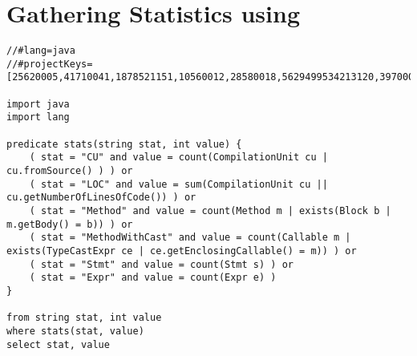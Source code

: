 
\chapter{Gathering Statistics using \ql{}}
\label{cha:ap:qlstats}

\begin{lstlisting}[style=ql]
//#lang=java
//#projectKeys=[25620005,41710041,1878521151,10560012,28580018,5629499534213120,39700035,1977701350,1873830050,1862920424,1864641207,1877441651,48190073,1506524326358,1505958786078,1506178136997,1981031959,1879370025,1874822090,1790840019,1864280925,41633751,1876381512,12760012,41900048,1354020033,1505967666111,1867300198,1795210073,1505968065973,1862771155,940125,2033800529,11020029,1505958645990,7870148,1861351166,1977291520,1978970761,1983122555,2161760237,1859762138,2035290917,1883290288,6890001,1981271240,1864352334,1979491471,1860005,13140029,24100035,35820136,1875601332,48640041,1877370912,1869242377,1872920090,1859802304,1973732641,1867040683,7880116,1971931877,33010046,18080071,1920002,1882261774,1855931308,1882380719,48790008,1505950676906,4870147,1860497242,1860885457,1883110029,1863051015,49820009,122244312,1861232120,1869270619,4850066,1872820788,6780442,1506173707109,1506179906986,32470022,1874830030,1797540044,1971780069,1968931653,1856951538,1908860284,1861491397,1884210730,1867130795,15070006,1798270110,46050017,1983122556,1856772013,35820134,1866091663,7860138,1866211423,1506494716249,1860946741,1505959776000,1880610249,1854901091,28741840,1972891707,6810158,1866061568,1982361113,1883200014,1505956416964,33815278,1869251537,1863190961,1874861017,1880570060,1863170850,1876500483,1873950073,1978970753,1878460091,1863001776,1874820078,7870357,10190041,1877480006,27300077,37220006,1882220728,1860774854,1977502912,1796321258,1877840310,2032670435,10130004,1971742352,1867160838,2980123,1878170062,1506502526259,1987320554,1862301883,1854881430,4840137,16030025,1505967225983,1855701520,1864150769,1859473908,1505958176673,2980106,1505964916170,1863840499,42360304,1984120998,1791770031,1506178546734,1856921186,1856830886,23842748,1506177197587,1857631417,1985420889,12170495,1861920745,1878800409,1860885493,1863511591,1876470319,3980080,17445104,5990306,1791430060,1344240419,1863420972,7870349,7890422,30640057,22650009,930029,1978821253,1868250766,1797370124,1973531692,7850125,1883460971,1984082076,1874820076,1874870633,20820034,30360001]

import java
import lang

predicate stats(string stat, int value) {
    ( stat = "CU" and value = count(CompilationUnit cu | cu.fromSource() ) ) or
    ( stat = "LOC" and value = sum(CompilationUnit cu || cu.getNumberOfLinesOfCode()) ) or
    ( stat = "Method" and value = count(Method m | exists(Block b | m.getBody() = b)) ) or
    ( stat = "MethodWithCast" and value = count(Callable m | exists(TypeCastExpr ce | ce.getEnclosingCallable() = m)) ) or
    ( stat = "Stmt" and value = count(Stmt s) ) or
    ( stat = "Expr" and value = count(Expr e) )
}

from string stat, int value
where stats(stat, value)
select stat, value
\end{lstlisting}